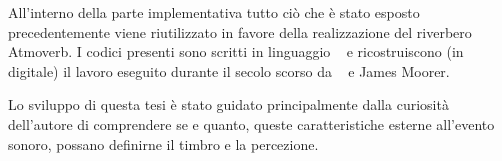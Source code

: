 All'interno della parte implementativa tutto ciò che è stato esposto precedentemente viene
riutilizzato in favore della realizzazione del riverbero Atmoverb. I codici presenti sono scritti in
linguaggio \faust~ e ricostruiscono (in digitale) il lavoro eseguito durante il secolo scorso da
\ms~ e James Moorer.

Lo sviluppo di questa tesi è stato guidato principalmente dalla curiosità 
dell’autore di comprendere se e quanto, queste caratteristiche esterne all’evento sonoro, possano 
definirne il timbro e la percezione.

\bigskip



